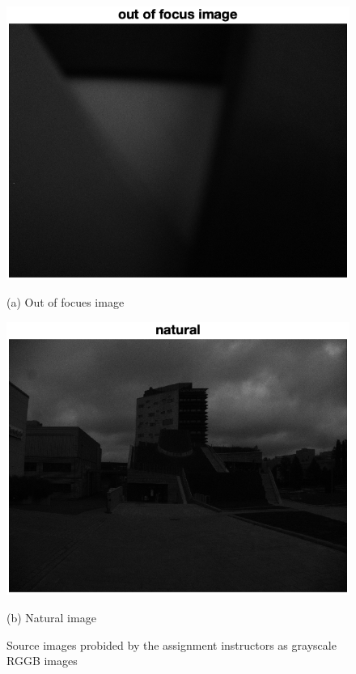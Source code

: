 \documentclass[12pt,a4paper,english
]{tunithesis}
\begin{document}
\begin{figure}[h]
  \centering
  \begin{minipage}[b]{0.45\textwidth}
    \includegraphics[width=\textwidth]{img/out_of_focus_start.png}
    \caption*{(a) Out of focues image}
  \end{minipage}
  \hfill
  \begin{minipage}[b]{0.45\textwidth}
    \includegraphics[width=\textwidth]{img/natural_start.png}
    \caption*{(b) Natural image}
  \end{minipage}
  \caption{Source images probided by the assignment instructors as grayscale RGGB images}
  \label{fig:start-images}
\end{figure}
\end{document}
